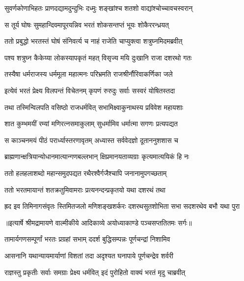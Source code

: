 \twolineshloka
{सुवर्णकोणाभिहतः प्राणदद्यामदुन्दुभिः}
{दध्मुः शङ्खांश्च शतशो वाद्यांश्चोच्चावचस्वरान्} %

\twolineshloka
{स तूर्य घोषः सुमहान्दिवमापूरयन्निव}
{भरतं शोकसन्तप्तं भूयः शोकैररन्ध्रयत्} %

\twolineshloka
{ततो प्रबुद्धो भरतस्तं घोषं संनिवर्त्य च}
{नाहं राजेति चाप्युक्त्वा शत्रुघ्नमिदमब्रवीत्} %

\twolineshloka
{पश्य शत्रुघ्न कैकेय्या लोकस्यापकृतं महत्}
{विसृज्य मयि दुःखानि राजा दशरथो गतः} %

\twolineshloka
{तस्यैषा धर्मराजस्य धर्ममूला महात्मनः}
{परिभ्रमति राजश्रीर्नौरिवाकर्णिका जले} %

\twolineshloka
{इत्येवं भरतं प्रेक्ष्य विलपन्तं विचेतनम्}
{कृपणं रुरुदुः सर्वाः सस्वरं योषितस्तदा} %

\twolineshloka
{तथा तस्मिन्विलपति वसिष्ठो राजधर्मवित्}
{सभामिक्ष्वाकुनाथस्य प्रविवेश महायशाः} %

\twolineshloka
{शात कुम्भमयीं रम्यां मणिरत्नसमाकुलाम्}
{सुधर्मामिव धर्मात्मा सगणः प्रत्यपद्यत} %

\twolineshloka
{स काञ्चनमयं पीठं परार्ध्यास्तरणावृतम्}
{अध्यास्त सर्ववेदज्ञो दूताननुशशास च} %

\twolineshloka
{ब्राह्मणान्क्षत्रियान्योधानमात्यान्गणबल्लभान्}
{क्षिप्रमानयताव्यग्राः कृत्यमात्ययिकं हि नः} %

\twolineshloka
{ततो हलहलाशब्दो महान्समुदपद्यत}
{रथैरश्वैर्गजैश्चापि जनानामुपगच्छताम्} %

\twolineshloka
{ततो भरतमायान्तं शतक्रतुमिवामराः}
{प्रत्यनन्दन्प्रकृतयो यथा दशरथं तथा} %

\fourlineindentedshloka
{ह्रद इव तिमिनागसंवृतः}
{स्तिमितजलो मणिशङ्खशर्करः}
{दशरथसुतशोभिता सभा}
{सदशरथेव बभौ यथा पुरा} %


{॥इत्यार्षे श्रीमद्रामायणे वाल्मीकीये आदिकाव्ये अयोध्याकाण्डे पञ्चसप्ततितमः सर्गः॥}


\twolineshloka
{तामार्यगणसम्पूर्णां भरतः प्रग्रहां सभाम्}
{ददर्श बुद्धिसम्पन्नः पूर्णचन्द्रां निशामिव} %

\twolineshloka
{आसनानि यथान्यायमार्याणां विशतां तदा}
{अदृश्यत घनापाये पूर्णचन्द्रेव शर्वरी} %

\twolineshloka
{राज्ञस्तु प्रकृतीः सर्वाः समग्राः प्रेक्ष्य धर्मवित्}
{इदं पुरोहितो वाक्यं भरतं मृदु चाब्रवीत्} %

